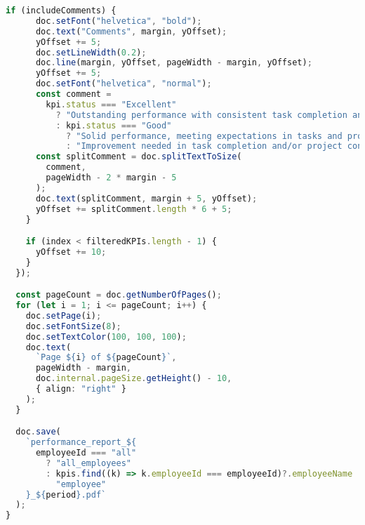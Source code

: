 \begin{lstlisting}[language=Typescript, caption=Тайлан автоматаар гаргах, frame=single]
    if (includeComments) {
      doc.setFont("helvetica", "bold");
      doc.text("Comments", margin, yOffset);
      yOffset += 5;
      doc.setLineWidth(0.2);
      doc.line(margin, yOffset, pageWidth - margin, yOffset);
      yOffset += 5;
      doc.setFont("helvetica", "normal");
      const comment =
        kpi.status === "Excellent"
          ? "Outstanding performance with consistent task completion and significant project contributions."
          : kpi.status === "Good"
            ? "Solid performance, meeting expectations in tasks and projects."
            : "Improvement needed in task completion and/or project contributions.";
      const splitComment = doc.splitTextToSize(
        comment,
        pageWidth - 2 * margin - 5
      );
      doc.text(splitComment, margin + 5, yOffset);
      yOffset += splitComment.length * 6 + 5;
    }

    if (index < filteredKPIs.length - 1) {
      yOffset += 10;
    }
  });

  const pageCount = doc.getNumberOfPages();
  for (let i = 1; i <= pageCount; i++) {
    doc.setPage(i);
    doc.setFontSize(8);
    doc.setTextColor(100, 100, 100);
    doc.text(
      `Page ${i} of ${pageCount}`,
      pageWidth - margin,
      doc.internal.pageSize.getHeight() - 10,
      { align: "right" }
    );
  }

  doc.save(
    `performance_report_${
      employeeId === "all"
        ? "all_employees"
        : kpis.find((k) => k.employeeId === employeeId)?.employeeName ||
          "employee"
    }_${period}.pdf`
  );
}
\end{lstlisting}